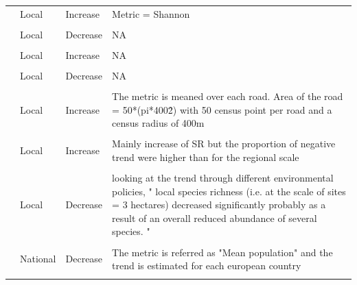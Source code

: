 \documentclass[
  12pt,
  oneside]{report}
\begin{document}
\begin{landscape}
\begin{longtable}[t]{>{\raggedright\arraybackslash}p{6.5em}>{\raggedright\arraybackslash}p{6.5em}>{\raggedright\arraybackslash}p{6.5em}>{\raggedright\arraybackslash}p{40em}}
 & Local & Increase & Metric = Shannon\\
\cellcolor{gray!6}{} & \cellcolor{gray!6}{Local} & \cellcolor{gray!6}{Increase} & \cellcolor{gray!6}{Metric = Simpson}\\
 & Local & Decrease & NA\\
\cellcolor{gray!6}{} & \cellcolor{gray!6}{Local} & \cellcolor{gray!6}{Increase} & \cellcolor{gray!6}{\vphantom{2} NA}\\
\addlinespace
 & Local & Increase & \vphantom{1} NA\\
\cellcolor{gray!6}{} & \cellcolor{gray!6}{Local} & \cellcolor{gray!6}{Increase} & \cellcolor{gray!6}{NA}\\
\cite{sorte_changes_2005} & Local & Decrease & NA\\
\cellcolor{gray!6}{} & \cellcolor{gray!6}{Local} & \cellcolor{gray!6}{Decrease} & \cellcolor{gray!6}{Metric = evenness}\\
 & Local & Increase & The metric is meaned over each road. Area of the road = 50*(pi*400\^2) with 50 census point per road and a census radius of 400m\\
\addlinespace
\cellcolor{gray!6}{\cite{van_turnhout_scale-dependent_2007}} & \cellcolor{gray!6}{Regional} & \cellcolor{gray!6}{Increase} & \cellcolor{gray!6}{For each region, the trend is computed using the mean number of species per atlas square}\\
 & Local & Increase & Mainly increase of SR but the proportion of negative trend were higher than for the regional scale\\
\cellcolor{gray!6}{} & \cellcolor{gray!6}{National} & \cellcolor{gray!6}{Increase} & \cellcolor{gray!6}{National scale}\\
\cite{wretenberg_changes_2010} & Local & Decrease & looking at the trend through different environmental policies, " local species richness (i.e. at the scale of sites = 3 hectares) decreased significantly probably as a result of an overall reduced abundance of several species. "\\
\cellcolor{gray!6}{\cite{inger_common_2015}} & \cellcolor{gray!6}{National} & \cellcolor{gray!6}{Decrease} & \cellcolor{gray!6}{NA}\\
\addlinespace
\cite{donald_agricultural_2001} & National & Decrease & The metric is referred as "Mean population" and the trend is estimated for each european country\\*
\end{longtable}
\endgroup{}
\end{landscape}
\end{document}
